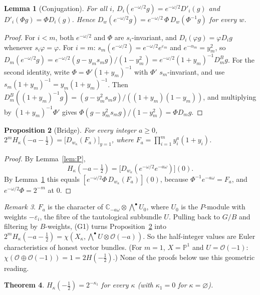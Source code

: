\documentclass[11pt]{amsart}
\newtheorem{theorem}{Theorem}[section]
\newtheorem{proposition}[theorem]{Proposition}
\newtheorem{lemma}[theorem]{Lemma}
\theoremstyle{definition}
\theoremstyle{remark}
\newtheorem{remark}[theorem]{Remark}
\newcommand{\cO}{\mathcal{O}}
\newcommand{\C}{\mathbb{C}}
\begin{document}
\begin{lemma}[Conjugation]\label{lem:C}
For all $i$, $D_i(e^{-\omega/2}g)=e^{-\omega/2}D'_i(g)$ and $D'_i(\Phi g)=\Phi D_i(g)$.
Hence $D_w(e^{-\omega/2}g)=e^{-\omega/2}\,\Phi\,D_w(\Phi^{-1}g)$ for every $w$.
\end{lemma}

\begin{proof}
For $i<m$, both $e^{-\omega/2}$ and $\Phi$ are $s_i$-invariant, and $D_i(\varphi g)=\varphi D_ig$
whenever $s_i\varphi=\varphi$. For $i=m$: $s_m(e^{-\omega/2})=e^{-\omega/2}e^{\varepsilon_m}$ and
$e^{-\alpha_m}=y_m^2$, so
$D_m(e^{-\omega/2}g)=e^{-\omega/2}(g-y_ms_mg)/(1-y_m^2)=e^{-\omega/2}(1+y_m)^{-1}D^B_mg$.
For the second identity, write $\Phi=\Phi'(1+y_m)^{-1}$ with $\Phi'$ $s_m$-invariant, and use
$s_m(1+y_m)^{-1}=y_m(1+y_m)^{-1}$. Then
$D^B_m((1+y_m)^{-1}g)=(g-y_m^2s_mg)/((1+y_m)(1-y_m))$, and multiplying by $(1+y_m)^{-1}\Phi'$
gives $\Phi(g-y_m^2s_mg)/(1-y_m^2)=\Phi D_mg$.
\end{proof}

\begin{proposition}[Bridge]\label{prop:bridge}
For every integer $a\ge0$,
$2^mH_\kappa(-a-\tfrac12)=\bigl[D_{w_\kappa}(F_a)\bigr]_{y=1}$, where
$F_a=\prod_{i=1}^my_i^a(1+y_i)$.
\end{proposition}

\begin{proof}
By Lemma~\ref{lem:P},
\[ H_\kappa(-a-\tfrac12)=\bigl[D_{w_\kappa}(e^{-\omega/2}e^{-a\omega})\bigr](0). \]
By Lemma~\ref{lem:C} this equals $[e^{-\omega/2}\Phi\,D_{w_\kappa}(F_a)](0)$, because
$\Phi^{-1}e^{-a\omega}=F_a$, and $e^{-\omega/2}\Phi=2^{-m}$ at $0$.
\end{proof}

\begin{remark}\label{rem:wedgeU}
$F_a$ is the character of $\C_{-a\omega}\otimes\bigwedge^\bullet U_0$, where $U_0$ is the
$P$-module with weights $-\varepsilon_i$, the fibre of the tautological subbundle $U$. Pulling
back to $G/B$ and filtering by $B$-weights, (G1) turns Proposition~\ref{prop:bridge} into
$2^mH_\kappa(-a-\tfrac12)=\chi(X_\kappa,\bigwedge^\bullet U\otimes\cO(-a))$. So the half-integer
values are Euler characteristics of honest vector bundles. (For $m=1$, $X=\mathbb{P}^1$ and
$U=\cO(-1)$: $\chi(\cO\oplus\cO(-1))=1=2H(-\tfrac12)$.) None of the proofs below use this
geometric reading.
\end{remark}

\begin{theorem}\label{thm:A}
$H_\kappa(-\tfrac12)=2^{-\kappa_1}$ for every $\kappa$ (with $\kappa_1=0$ for $\kappa=\varnothing$).
\end{theorem}
\end{document}
